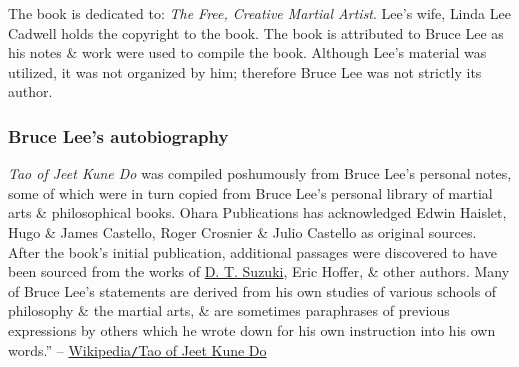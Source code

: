 \documentclass{article}
\begin{document}
The book is dedicated to: {\it The Free, Creative Martial Artist}. {\sc Lee}'s wife, {\sc Linda Lee Cadwell} holds the copyright to the book. The book is attributed to {\sc Bruce Lee} as his notes \& work were used to compile the book. Although {\sc Lee}'s material was utilized, it was not organized by him; therefore {\sc Bruce Lee} was not strictly its author.

\subsubsection{{\sc Bruce Lee}'s autobiography}
{\it Tao of Jeet Kune Do} was compiled poshumously from {\sc Bruce Lee}'s personal notes, some of which were in turn copied from {\sc Bruce Lee}'s personal library of martial arts \& philosophical books. Ohara Publications has acknowledged {\sc Edwin Haislet, Hugo \& James Castello, Roger Crosnier \& Julio Castello} as original sources. After the book's initial publication, additional passages were discovered to have been sourced from the works of \href{https://en.wikipedia.org/wiki/D.T._Suzuki}{\sc D. T. Suzuki}, {\sc Eric Hoffer}, \& other authors. Many of {\sc Bruce Lee}'s statements are derived from his own studies of various schools of philosophy \& the martial arts, \& are sometimes paraphrases of previous expressions by others which he wrote down for his own instruction into his own words.'' -- \href{https://en.wikipedia.org/wiki/Tao_of_Jeet_Kune_Do}{Wikipedia{\tt/}Tao of Jeet Kune Do}


\printbibliography[heading=bibintoc]
\end{document}
